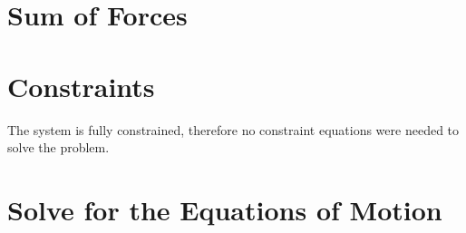 \documentclass[12pt]{report}
\begin{document}
\begin{flushleft}
%       
\section{Sum of Forces}
\section{Constraints}
The system is fully constrained, therefore no constraint equations were needed to
solve the problem.
\section{Solve for the Equations of Motion}

\newpage

\end{flushleft}
\end{document}
